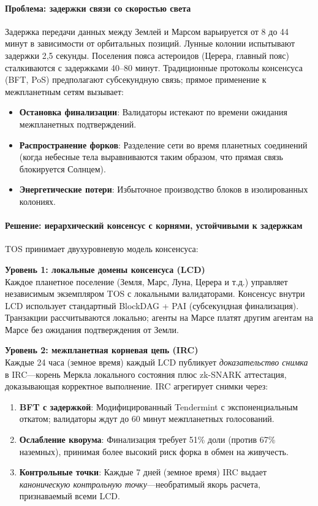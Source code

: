 \documentclass[11pt]{article}
\begin{document}
\paragraph{Проблема: задержки связи со скоростью света}
Задержка передачи данных между Землей и Марсом варьируется от 8 до 44 минут в зависимости от орбитальных позиций. Лунные колонии испытывают задержки 2,5 секунды. Поселения пояса астероидов (Церера, главный пояс) сталкиваются с задержками 40--80 минут. Традиционные протоколы консенсуса (BFT, PoS) предполагают субсекундную связь; прямое применение к межпланетным сетям вызывает:
\begin{itemize}[noitemsep]
  \item \textbf{Остановка финализации}: Валидаторы истекают по времени ожидания межпланетных подтверждений.
  \item \textbf{Распространение форков}: Разделение сети во время планетных соединений (когда небесные тела выравниваются таким образом, что прямая связь блокируется Солнцем).
  \item \textbf{Энергетические потери}: Избыточное производство блоков в изолированных колониях.
\end{itemize}

\paragraph{Решение: иерархический консенсус с корнями, устойчивыми к задержкам}
TOS принимает двухуровневую модель консенсуса:

\textbf{Уровень 1: локальные домены консенсуса (LCD)}\\
Каждое планетное поселение (Земля, Марс, Луна, Церера и т.д.) управляет независимым экземпляром TOS с локальными валидаторами. Консенсус внутри LCD использует стандартный BlockDAG + PAI (субсекундная финализация). Транзакции рассчитываются локально; агенты на Марсе платят другим агентам на Марсе без ожидания подтверждения от Земли.

\textbf{Уровень 2: межпланетная корневая цепь (IRC)}\\
Каждые 24 часа (земное время) каждый LCD публикует \emph{доказательство снимка} в IRC—корень Меркла локального состояния плюс zk-SNARK аттестация, доказывающая корректное выполнение. IRC агрегирует снимки через:
\begin{enumerate}[noitemsep]
  \item \textbf{BFT с задержкой}: Модифицированный Tendermint с экспоненциальным откатом; валидаторы ждут до 60 минут межпланетных голосований.
  \item \textbf{Ослабление кворума}: Финализация требует 51\% доли (против 67\% наземных), принимая более высокий риск форка в обмен на живучесть.
  \item \textbf{Контрольные точки}: Каждые 7 дней (земное время) IRC выдает \emph{каноническую контрольную точку}—необратимый якорь расчета, признаваемый всеми LCD.
\end{enumerate}
\end{document}
